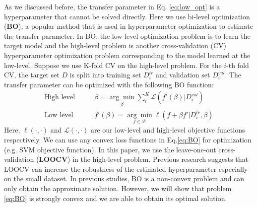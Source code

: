 As we discussed before, the transfer parameter in Eq. \eqref{eq:low_opt} is a hyperparameter that cannot be solved directly. 
Here we use bi-level optimization (\textbf{BO})\cite{Pedregosa16}, a popular method that is used in hyperparameter optimization to estimate the transfer parameter. In BO, the low-level optimization problem is to learn the target model and the high-level problem is another cross-validation (CV) hyperparameter optimization problem corresponding to the model learned at the low-level.
Suppose we use K-fold CV on the high-level problem. For the $i$-th fold CV, the target set $D$ is split into training set $D_i^{tr}$ and validation set $D_i^{val}$. The transfer parameter can be optimized with the following BO function:
\begin{equation}\label{eq:BO}
\begin{aligned}
\text{High level}\qquad&\beta=\underset{\beta}{\arg \min}\sum_i^K\mathcal{L}(f^{i}(\beta)|D_i^{val})\\
\text{Low level}\qquad&f^{i}(\beta)=\underset{f \in \mathcal{F}}{\arg \min}\ell\left(f+\beta f'|D_i^{tr},\beta\right) 
\end{aligned}
\end{equation} 
Here, $\ell(\cdot,\cdot)$ and $\mathcal{L}(\cdot,\cdot)$ are our low-level and high-level objective functions respectively. We can use any convex loss functions in Eq.\eqref{eq:BO} for optimization (e.g. SVM objective function). In this paper, we use the leave-one-out cross-validation (\textbf{LOOCV}) in the high-level problem. Previous research \cite{kuzborskij2013stability} suggests that LOOCV can increase the robustness of the estimated hyperparameter especially on the small dataset.
In previous studies\cite{maclaurin2015gradient,Pedregosa16}, BO is a non-convex problem and can only obtain the approximate solution. However, we will show that problem \eqref{eq:BO} is strongly convex and we are able to obtain its optimal solution. 
